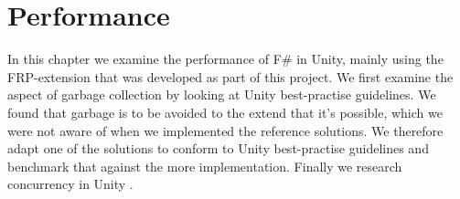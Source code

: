 \chapter{Performance}
In this chapter we examine the performance of F\# in Unity, mainly using the \gls{FRP}-extension that was developed as part of this project. We first examine the aspect of garbage collection by looking at Unity best-practise guidelines. We found that garbage is to be avoided to the extend that it's possible, which we were not aware of when we implemented the reference solutions. We therefore adapt one of the solutions to conform to Unity best-practise guidelines and benchmark that against the more  implementation. Finally we research concurrency in Unity .


